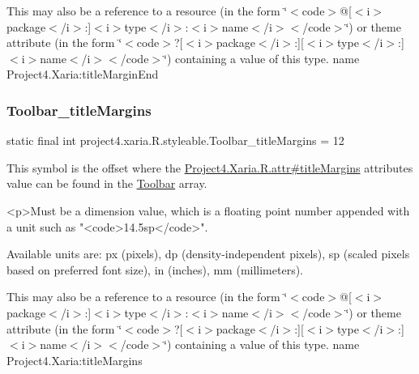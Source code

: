 This may also be a reference to a resource (in the form \char`\"{}$<$code$>$@\mbox{[}$<$i$>$package$<$/i$>$\+:\mbox{]}$<$i$>$type$<$/i$>$\+:$<$i$>$name$<$/i$>$$<$/code$>$\char`\"{}) or theme attribute (in the form \char`\"{}$<$code$>$?\mbox{[}$<$i$>$package$<$/i$>$\+:\mbox{]}\mbox{[}$<$i$>$type$<$/i$>$\+:\mbox{]}$<$i$>$name$<$/i$>$$<$/code$>$\char`\"{}) containing a value of this type.  name Project4.\+Xaria\+:title\+Margin\+End \mbox{\label{classproject4_1_1xaria_1_1R_1_1styleable_aad3d076117cb0923a57bf3c96cc0a6d5}} 
\subsubsection{\texorpdfstring{Toolbar\+\_\+title\+Margins}{Toolbar\_titleMargins}}
{\footnotesize\ttfamily static final int project4.\+xaria.\+R.\+styleable.\+Toolbar\+\_\+title\+Margins = 12\hspace{0.3cm}{\ttfamily [static]}}

This symbol is the offset where the \hyperlink{}{Project4.\+Xaria.\+R.\+attr\#title\+Margins} attribute\textquotesingle{}s value can be found in the \hyperlink{classproject4_1_1xaria_1_1R_1_1styleable_af6c30f9e9e086f6bf4e510669443fa59}{Toolbar} array.

\begin{DoxyVerb}      <p>Must be a dimension value, which is a floating point number appended with a unit such as "<code>14.5sp</code>".
\end{DoxyVerb}
 Available units are\+: px (pixels), dp (density-\/independent pixels), sp (scaled pixels based on preferred font size), in (inches), mm (millimeters). 

This may also be a reference to a resource (in the form \char`\"{}$<$code$>$@\mbox{[}$<$i$>$package$<$/i$>$\+:\mbox{]}$<$i$>$type$<$/i$>$\+:$<$i$>$name$<$/i$>$$<$/code$>$\char`\"{}) or theme attribute (in the form \char`\"{}$<$code$>$?\mbox{[}$<$i$>$package$<$/i$>$\+:\mbox{]}\mbox{[}$<$i$>$type$<$/i$>$\+:\mbox{]}$<$i$>$name$<$/i$>$$<$/code$>$\char`\"{}) containing a value of this type.  name Project4.\+Xaria\+:title\+Margins \mbox{\label{classproject4_1_1xaria_1_1R_1_1styleable_a96bcd70f7086d38b52652bee6e3f119a}} 
